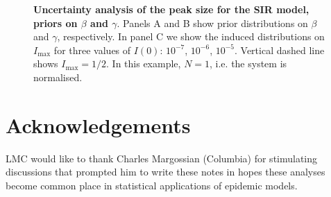 \documentclass[a4paper, notitlepage, 10pt]{article}
\begin{document}
\begin{figure}[!ht]
\caption{\textbf{Uncertainty analysis of the peak size for the SIR model, priors on $\beta$ and $\gamma$}.
Panels A and B show prior distributions on $\beta$ and $\gamma$, respectively.
In panel C we show the induced distributions on $I_{\max}$ for three values of $I(0)$: $10^{-7}$, $10^{-6}$, $10^{-5}$.
Vertical dashed line shows $I_{\max} = 1/2$.
In this example, $N = 1$, i.e. the system is normalised.
}
\label{fig:simple_Imax_Boarding}
\end{figure}



\section*{Acknowledgements}

LMC would like to thank Charles Margossian (Columbia) for stimulating discussions that prompted him to write these notes in hopes these analyses become common place in statistical applications of epidemic models.



\end{document}

